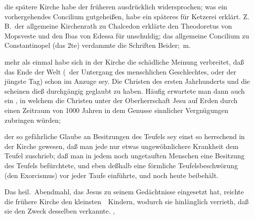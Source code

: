 \begin{aufza}
\item die spätere Kirche habe der früheren ausdrücklich widersprochen; was ein vorhergehendes Concilium gutgeheißen, habe ein späteres für Ketzerei erklärt. Z.\,B.\ der allgemeine Kirchenrath zu Chalcedon erklärte den Theodoretus von Mopsveste und den Ibas von Edessa für unschuldig; das allgemeine Concilium zu Constantinopel (das 2te) verdammte die Schriften Beider; \udgl\,m.
\item mehr als einmal habe sich in der Kirche die schädliche Meinung verbreitet, daß das Ende der Welt (\dh\ der Untergang des menschlichen Geschlechtes, oder der jüngste Tag) schon im Anzuge sey. Die Christen des ersten Jahrhunderts und die  scheinen dieß durchgängig geglaubt zu haben. Häufig erwartete man dann auch ein , in welchem die Christen unter der Oberherrschaft Jesu auf Erden durch einen Zeitraum von 1000 Jahren in dem Genusse sinnlicher Vergnügungen zubringen würden;
\item der so gefährliche Glaube an Besitzungen des Teufels sey einst so herrschend in der Kirche gewesen, daß man jede nur etwas ungewöhnlichere Krankheit dem Teufel zuschrieb; daß man in jedem noch ungetauften Menschen eine Besitzung des Teufels befürchtete, und eben deßhalb eine förmliche Teufelsbeschwörung (den Exorcismus) vor jeder Taufe einführte, und noch heute beibehält.
\item Das heil.\ Abendmahl, das Jesus zu seinem Gedächtnisse eingesetzt hat, reichte die frühere Kirche den kleinsten~\ Kindern, wodurch sie hinlänglich verrieth, daß sie den Zweck desselben verkannte. \Usw , \usw
\end{aufza}

\begin{center}\end{center}


